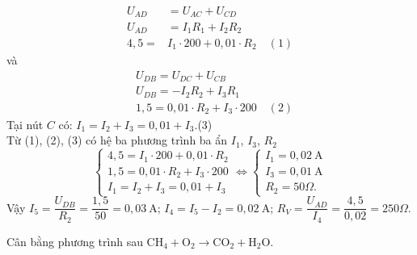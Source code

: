 \begin{vd}
{$$\begin{aligned}
		U_{A D} &=U_{A C}+U_{C D} \\
		U_{A D} &=I_1 R_1+I_2 R_2 \\
		4{,}5=& I_1 \cdot 200+0{,}01 \cdot R_2 \quad(1)
			\end{aligned}$$
và $$			\begin{aligned}
		& U_{D B}=U_{D C}+U_{C B} \\
		& U_{D B}=-I_2 R_2+I_3 R_1 \\
		& 1,5=0,01 \cdot R_2+I_3 \cdot 200\quad(2)
	\end{aligned}
	$$
	Tại nút $C$ có:
	$	I_1=I_2+I_3=0{,}01+I_3$.\quad(3)\\
Từ  (1), (2), (3) có hệ ba phương trình ba ẩn $I_1$, $I_3$, $R_2$
	$$
	\left\{\begin{array} { l } 
		{ 4 , 5 = I _ { 1 } \cdot 2 0 0 + 0 , 0 1 \cdot R _ { 2 } } \\
		{ 1 , 5 = 0 , 0 1 \cdot R _ { 2 } + I _ { 3 } \cdot 2 0 0 } \\
		{ I _ { 1 } = I _ { 2 } + I _ { 3 } = 0 , 0 1 + I _ { 3 } }
	\end{array} \Leftrightarrow \left\{\begin{array}{l}
		I_1=0{,}02 \mathrm{~A} \\
		I_3=0{,}01 \mathrm{~A} \\
		R_2=50 \Omega.
	\end{array}\right.\right.
	$$
Vậy $I_5=\dfrac{U_{D B}}{R_2}=\dfrac{1{,}5}{50}=0{,}03 \mathrm{~A}$; $I_4=I_5-I_2=0{,}02 \mathrm{~A}$;
		$ R_V=\dfrac{U_{A D}}{I_4}=\dfrac{4{,}5}{0{,}02}=250 \Omega$.
}
	\end{vd}
\begin{vd}%
	Cân bằng phương trình sau
$\mathrm{CH}_4+\mathrm{O}_2\rightarrow\mathrm{CO}_2+\mathrm{H}_2 \mathrm{O}$.
	\end{vd}
